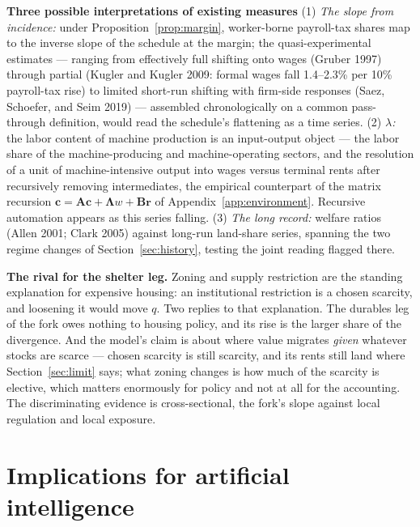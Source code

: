 \documentclass[12pt]{article}
\theoremstyle{plain}
\begin{document}
\textbf{Three possible interpretations of existing measures} (1) \emph{The slope from incidence:} under Proposition~\ref{prop:margin}, worker-borne payroll-tax shares map to the inverse slope of the schedule at the margin; the quasi-experimental estimates --- ranging from effectively full shifting onto wages (Gruber 1997) through partial (Kugler and Kugler 2009: formal wages fall 1.4--2.3\% per 10\% payroll-tax rise) to limited short-run shifting with firm-side responses (Saez, Schoefer, and Seim 2019) --- assembled chronologically on a common pass-through definition, would read the schedule's flattening as a time series. (2) \emph{$\lambda$:} the labor content of machine production is an input-output object --- the labor share of the machine-producing and machine-operating sectors, and the resolution of a unit of machine-intensive output into wages versus terminal rents after recursively removing intermediates, the empirical counterpart of the matrix recursion $\mathbf{c} = \mathbf{A}\mathbf{c} + \boldsymbol{\Lambda}w + \mathbf{B}\mathbf{r}$ of Appendix~\ref{app:environment}. Recursive automation appears as this series falling. (3) \emph{The long record:} welfare ratios (Allen 2001; Clark 2005) against long-run land-share series, spanning the two regime changes of Section~\ref{sec:history}, testing the joint reading flagged there.

\textbf{The rival for the shelter leg.} Zoning and supply restriction are the standing explanation for expensive housing: an institutional restriction is a chosen scarcity, and loosening it would move $q$. Two replies to that explanation. The durables leg of the fork owes nothing to housing policy, and its rise is the larger share of the divergence. And the model's claim is about where value migrates \emph{given} whatever stocks are scarce --- chosen scarcity is still scarcity, and its rents still land where Section~\ref{sec:limit} says; what zoning changes is how much of the scarcity is elective, which matters enormously for policy and not at all for the accounting. The discriminating evidence is cross-sectional, the fork's slope against local regulation and local exposure.

\section{Implications for artificial intelligence}\label{sec:ai}
\end{document}

